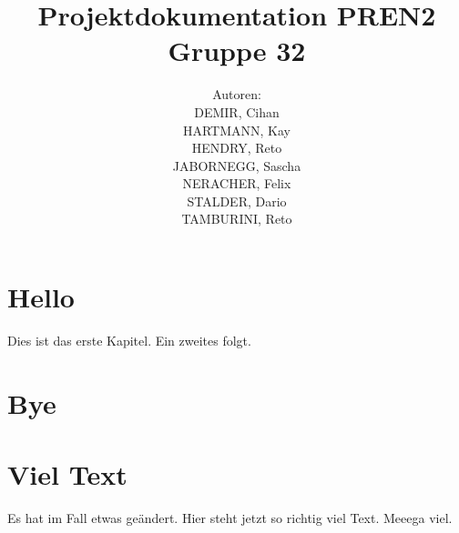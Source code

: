 \documentclass[11pt,german]{article}
\author{	Autoren:\\
			DEMIR, Cihan\\
			HARTMANN, Kay\\
			HENDRY, Reto\\
			JABORNEGG, Sascha\\
			NERACHER, Felix\\			
			STALDER, Dario\\
			TAMBURINI, Reto\\
		}
\title{Projektdokumentation PREN2\\Gruppe 32}
\begin{document}
  \maketitle
  \tableofcontents
	\newpage	
  \section{Hello}
  Dies ist das erste Kapitel.
  Ein zweites folgt.
  \section{Bye}
  \section{Viel Text}
  Es hat im Fall etwas geändert.
  Hier steht jetzt so richtig viel Text.
  Meeega viel.
\end{document}
